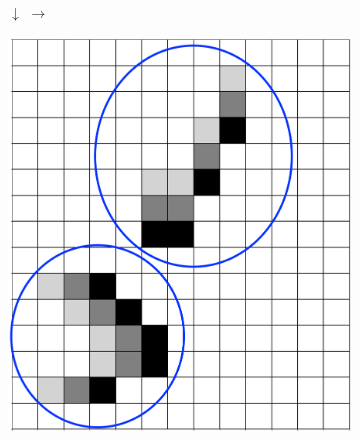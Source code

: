 \documentclass[12pt]{article}
\numberwithin{figure}{section} %
\begin{document}
\begin{figure}[H]
	\begin{subfigure}[t]{0.06\textwidth}
		\centering
		{\LARGE$\downarrow{}$}
		{\LARGE$\xrightarrow{}$}
  	\end{subfigure}	
	\begin{subfigure}{0.22\textwidth}
     		\includegraphics[width=\linewidth]{Section4/36.0}
     		\subcaption{}
   	\end{subfigure}
    	\begin{subfigure}{0.22\textwidth}

\end{subfigure}
\end{figure}
\end{document}
